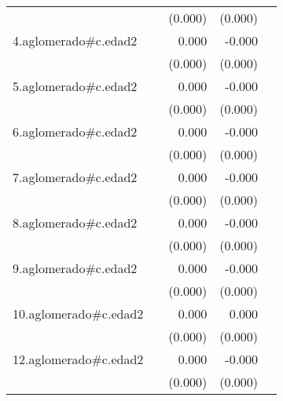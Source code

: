 {\begin{longtable}{l*{4}{D{.}{.}{-1}}}
            &                     &     (0.000)         &     (0.000)         &                     \\
\addlinespace
4.aglomerado#c.edad2&                     &       0.000         &      -0.000         &                     \\
            &                     &     (0.000)         &     (0.000)         &                     \\
\addlinespace
5.aglomerado#c.edad2&                     &       0.000         &      -0.000         &                     \\
            &                     &     (0.000)         &     (0.000)         &                     \\
\addlinespace
6.aglomerado#c.edad2&                     &       0.000         &      -0.000\sym{*}  &                     \\
            &                     &     (0.000)         &     (0.000)         &                     \\
\addlinespace
7.aglomerado#c.edad2&                     &       0.000         &      -0.000         &                     \\
            &                     &     (0.000)         &     (0.000)         &                     \\
\addlinespace
8.aglomerado#c.edad2&                     &       0.000         &      -0.000         &                     \\
            &                     &     (0.000)         &     (0.000)         &                     \\
\addlinespace
9.aglomerado#c.edad2&                     &       0.000         &      -0.000         &                     \\
            &                     &     (0.000)         &     (0.000)         &                     \\
\addlinespace
10.aglomerado#c.edad2&                     &       0.000\sym{**} &       0.000         &                     \\
            &                     &     (0.000)         &     (0.000)         &                     \\
\addlinespace
12.aglomerado#c.edad2&                     &       0.000         &      -0.000         &                     \\
            &                     &     (0.000)         &     (0.000)         &                     \\

\end{longtable}}
